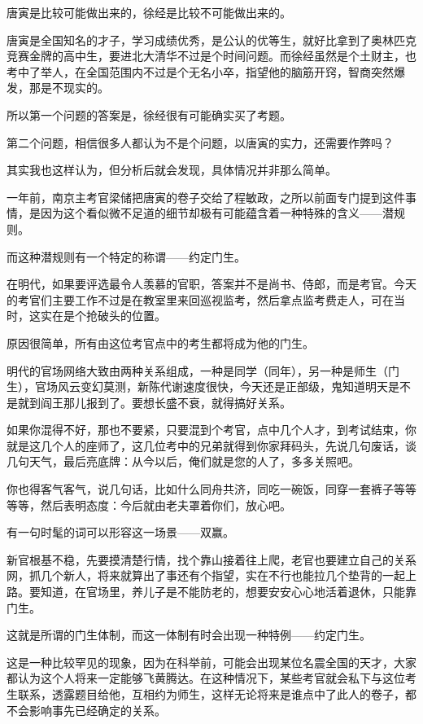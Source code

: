 \begin{multicols}{\theparacolNo}
唐寅是比较可能做出来的，徐经是比较不可能做出来的。

唐寅是全国知名的才子，学习成绩优秀，是公认的优等生，就好比拿到了奥林匹克竞赛金牌的高中生，要进北大清华不过是个时间问题。而徐经虽然是个土财主，也考中了举人，在全国范围内不过是个无名小卒，指望他的脑筋开窍，智商突然爆发，那是不现实的。

所以第一个问题的答案是，徐经很有可能确实买了考题。

第二个问题，相信很多人都认为不是个问题，以唐寅的实力，还需要作弊吗？

其实我也这样认为，但分析后就会发现，具体情况并非那么简单。

一年前，南京主考官梁储把唐寅的卷子交给了程敏政，之所以前面专门提到这件事情，是因为这个看似微不足道的细节却极有可能蕴含着一种特殊的含义——潜规则。

而这种潜规则有一个特定的称谓——约定门生。

在明代，如果要评选最令人羡慕的官职，答案并不是尚书、侍郎，而是考官。今天的考官们主要工作不过是在教室里来回巡视监考，然后拿点监考费走人，可在当时，这实在是个抢破头的位置。

原因很简单，所有由这位考官点中的考生都将成为他的门生。

明代的官场网络大致由两种关系组成，一种是同学（同年），另一种是师生（门生），官场风云变幻莫测，新陈代谢速度很快，今天还是正部级，鬼知道明天是不是就到阎王那儿报到了。要想长盛不衰，就得搞好关系。

如果你混得不好，那也不要紧，只要混到个考官，点中几个人才，到考试结束，你就是这几个人的座师了，这几位考中的兄弟就得到你家拜码头，先说几句废话，谈几句天气，最后亮底牌：从今以后，俺们就是您的人了，多多关照吧。

你也得客气客气，说几句话，比如什么同舟共济，同吃一碗饭，同穿一套裤子等等等等，然后表明态度：今后就由老夫罩着你们，放心吧。

有一句时髦的词可以形容这一场景——双赢。

新官根基不稳，先要摸清楚行情，找个靠山接着往上爬，老官也要建立自己的关系网，抓几个新人，将来就算出了事还有个指望，实在不行也能拉几个垫背的一起上路。要知道，在官场里，养儿子是不能防老的，想要安安心心地活着退休，只能靠门生。

这就是所谓的门生体制，而这一体制有时会出现一种特例——约定门生。

这是一种比较罕见的现象，因为在科举前，可能会出现某位名震全国的天才，大家都认为这个人将来一定能够飞黄腾达。在这种情况下，某些考官就会私下与这位考生联系，透露题目给他，互相约为师生，这样无论将来是谁点中了此人的卷子，都不会影响事先已经确定的关系。


\end{multicols}
